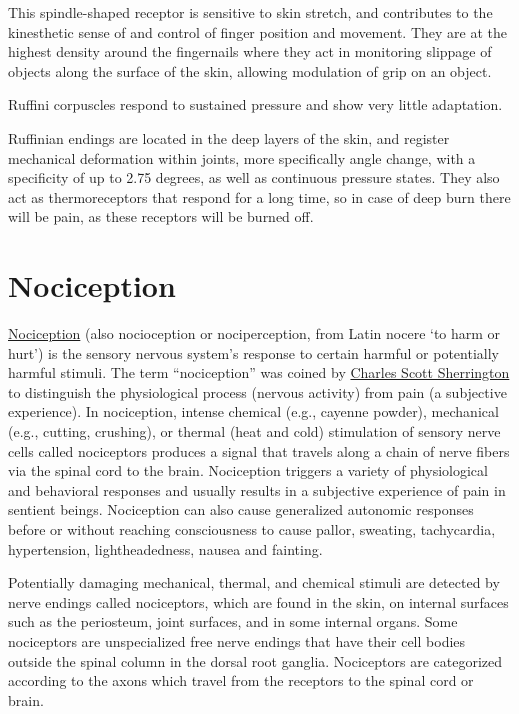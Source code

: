 This spindle-shaped receptor is sensitive to skin stretch, and contributes to the kinesthetic sense of and control of finger position and movement. They are at the highest density around the fingernails where they act in monitoring slippage of objects along the surface of the skin, allowing modulation of grip on an object.

Ruffini corpuscles respond to sustained pressure and show very little adaptation.

Ruffinian endings are located in the deep layers of the skin, and register mechanical deformation within joints, more specifically angle change, with a specificity of up to 2.75 degrees, as well as continuous pressure states. They also act as thermoreceptors that respond for a long time, so in case of deep burn there will be pain, as these receptors will be burned off.

\hypertarget{nociception}{%
\section{Nociception}\label{nociception}}

\href{https://en.wikipedia.org/wiki/Nociception}{Nociception} (also nocioception or nociperception, from Latin nocere `to harm or hurt') is the sensory nervous system's response to certain harmful or potentially harmful stimuli. The term ``nociception'' was coined by \href{https://en.wikipedia.org/wiki/Charles_Scott_Sherrington}{Charles Scott Sherrington} to distinguish the physiological process (nervous activity) from pain (a subjective experience). In nociception, intense chemical (e.g., cayenne powder), mechanical (e.g., cutting, crushing), or thermal (heat and cold) stimulation of sensory nerve cells called nociceptors produces a signal that travels along a chain of nerve fibers via the spinal cord to the brain. Nociception triggers a variety of physiological and behavioral responses and usually results in a subjective experience of pain in sentient beings. Nociception can also cause generalized autonomic responses before or without reaching consciousness to cause pallor, sweating, tachycardia, hypertension, lightheadedness, nausea and fainting.

Potentially damaging mechanical, thermal, and chemical stimuli are detected by nerve endings called nociceptors, which are found in the skin, on internal surfaces such as the periosteum, joint surfaces, and in some internal organs. Some nociceptors are unspecialized free nerve endings that have their cell bodies outside the spinal column in the dorsal root ganglia. Nociceptors are categorized according to the axons which travel from the receptors to the spinal cord or brain.

